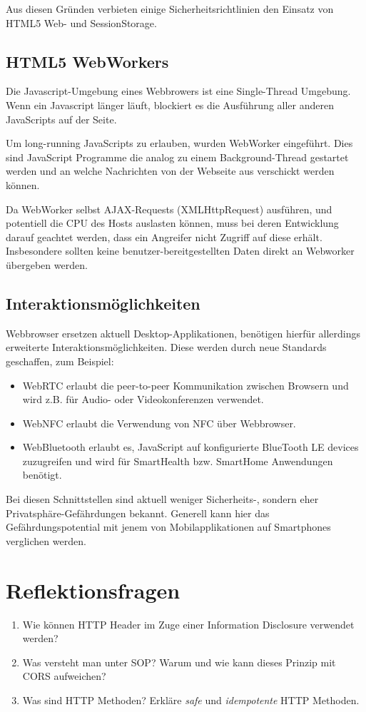 Aus diesen Gründen verbieten einige Sicherheitsrichtlinien den Einsatz von HTML5 Web- und SessionStorage.

\subsection{HTML5 WebWorkers}

Die Javascript-Umgebung eines Webbrowers ist eine Single-Thread Umgebung. Wenn ein Javascript länger läuft, blockiert es die Ausführung aller anderen JavaScripts auf der Seite.

Um long-running JavaScripts zu erlauben, wurden WebWorker eingeführt. Dies sind JavaScript Programme die analog zu einem Background-Thread gestartet werden und an welche Nachrichten von der Webseite aus verschickt werden können.

Da WebWorker selbst AJAX-Requests (XMLHttpRequest) ausführen, und potentiell die CPU des Hosts auslasten können, muss bei deren Entwicklung darauf geachtet werden, dass ein Angreifer nicht Zugriff auf diese erhält. Insbesondere sollten keine benutzer-bereitgestellten Daten direkt an Webworker übergeben werden.

\subsection{Interaktionsmöglichkeiten}

Webbrowser ersetzen aktuell Desktop-Applikationen, benötigen hierfür allerdings erweiterte Interaktionsmöglichkeiten. Diese werden durch neue Standards geschaffen, zum Beispiel:

\begin{itemize}
	\item WebRTC erlaubt die peer-to-peer Kommunikation zwischen Browsern und wird z.B. für Audio- oder Videokonferenzen verwendet.
	\item WebNFC erlaubt die Verwendung von NFC über Webbrowser.
	\item WebBluetooth erlaubt es, JavaScript auf konfigurierte BlueTooth LE devices zuzugreifen und wird für SmartHealth bzw. SmartHome Anwendungen benötigt.
\end{itemize}

Bei diesen Schnittstellen sind aktuell weniger Sicherheits-, sondern eher Privatsphäre-Gefährdungen bekannt. Generell kann hier das Gefährdungspotential mit jenem von Mobilapplikationen auf Smartphones verglichen werden.

\section{Reflektionsfragen}

\begin{enumerate}
	\item Wie können HTTP Header im Zuge einer Information Disclosure verwendet werden?
	\item Was versteht man unter SOP? Warum und wie kann dieses Prinzip mit CORS aufweichen?
	\item Was sind HTTP Methoden? Erkläre \textit{safe} und \textit{idempotente} HTTP Methoden.
\end{enumerate}

